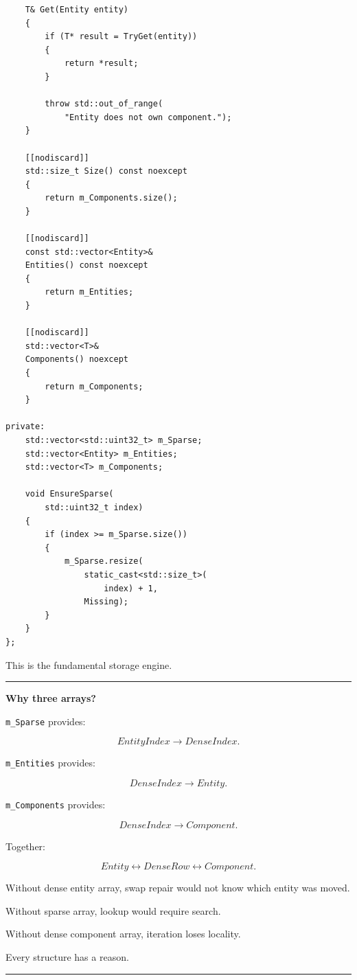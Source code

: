 \begin{verbatim}
    T& Get(Entity entity)
    {
        if (T* result = TryGet(entity))
        {
            return *result;
        }

        throw std::out_of_range(
            "Entity does not own component.");
    }

    [[nodiscard]]
    std::size_t Size() const noexcept
    {
        return m_Components.size();
    }

    [[nodiscard]]
    const std::vector<Entity>&
    Entities() const noexcept
    {
        return m_Entities;
    }

    [[nodiscard]]
    std::vector<T>&
    Components() noexcept
    {
        return m_Components;
    }

private:
    std::vector<std::uint32_t> m_Sparse;
    std::vector<Entity> m_Entities;
    std::vector<T> m_Components;

    void EnsureSparse(
        std::uint32_t index)
    {
        if (index >= m_Sparse.size())
        {
            m_Sparse.resize(
                static_cast<std::size_t>(
                    index) + 1,
                Missing);
        }
    }
};
\end{verbatim}

This is the fundamental storage engine.

\begin{center}\rule{0.5\linewidth}{0.5pt}\end{center}

\textbf{Why three arrays?}

\texttt{m\_Sparse} provides:

\[
EntityIndex\rightarrow DenseIndex.
\]

\texttt{m\_Entities} provides:

\[
DenseIndex\rightarrow Entity.
\]

\texttt{m\_Components} provides:

\[
DenseIndex\rightarrow Component.
\]

Together:

\[
Entity
\leftrightarrow
DenseRow
\leftrightarrow
Component.
\]

Without dense entity array, swap repair would not know which entity was moved.

Without sparse array, lookup would require search.

Without dense component array, iteration loses locality.

Every structure has a reason.

\begin{center}\rule{0.5\linewidth}{0.5pt}\end{center}

